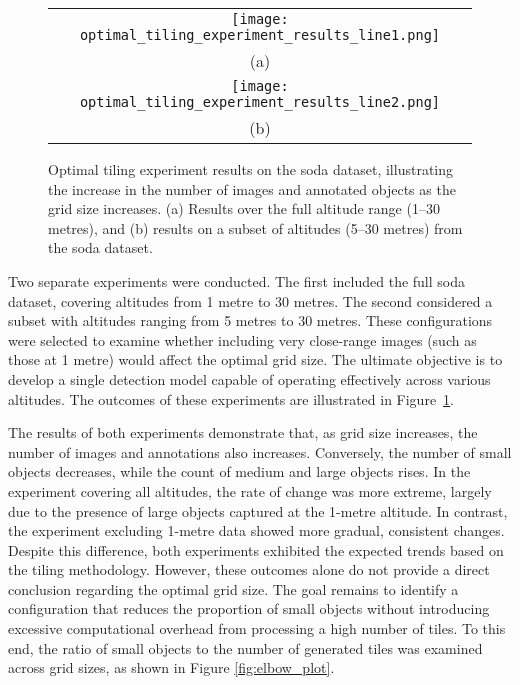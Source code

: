 \begin{figure}[!ht]
  \centering
  \begin{tabular}{c}
    \texttt{[image: optimal\_tiling\_experiment\_results\_line1.png]} \\
    \small (a) \\
    \addlinespace[1em]
    \texttt{[image: optimal\_tiling\_experiment\_results\_line2.png]} \\
    \small (b) \\
  \end{tabular}
  \caption{Optimal tiling experiment results on the \gls{soda} dataset, illustrating the increase in the number of images and annotated objects as the grid size increases. (a) Results over the full altitude range (1--30 metres), and (b) results on a subset of altitudes (5--30 metres) from the \gls{soda} dataset.}
  \label{fig:optimal_tiling_line}
\end{figure}

Two separate experiments were conducted. The first included the full \gls{soda} dataset, covering altitudes from 1 metre to 30 metres. The second considered a subset with altitudes ranging from 5 metres to 30 metres. These configurations were selected to examine whether including very close-range images (such as those at 1 metre) would affect the optimal grid size. The ultimate objective is to develop a single detection model capable of operating effectively across various altitudes. The outcomes of these experiments are illustrated in Figure~\ref{fig:optimal_tiling_line}.

The results of both experiments demonstrate that, as grid size increases, the number of images and annotations also increases. Conversely, the number of small objects decreases, while the count of medium and large objects rises. In the experiment covering all altitudes, the rate of change was more extreme, largely due to the presence of large objects captured at the 1-metre altitude. In contrast, the experiment excluding 1-metre data showed more gradual, consistent changes. Despite this difference, both experiments exhibited the expected trends based on the tiling methodology.
However, these outcomes alone do not provide a direct conclusion regarding the optimal grid size. The goal remains to identify a configuration that reduces the proportion of small objects without introducing excessive computational overhead from processing a high number of tiles. To this end, the ratio of small objects to the number of generated tiles was examined across grid sizes, as shown in Figure \ref{fig:elbow_plot}.

